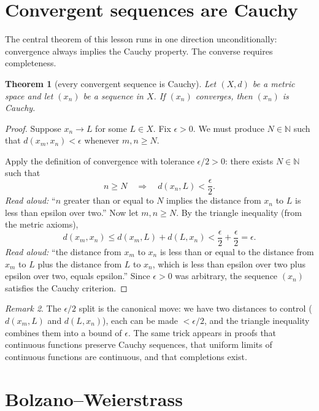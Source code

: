 \documentclass[11pt]{article}
\newtheorem{theorem}{Theorem}
\theoremstyle{definition}
\theoremstyle{remark}
\newtheorem{remark}[theorem]{Remark}
\begin{document}
\section{Convergent sequences are Cauchy}

The central theorem of this lesson runs in one direction
unconditionally: convergence always implies the Cauchy
property. The converse requires completeness.

\begin{theorem}[every convergent sequence is Cauchy]
\label{thm:conv-implies-cauchy}
Let $(X, d)$ be a metric space and let $(x_n)$ be a sequence
in $X$. If $(x_n)$ converges, then $(x_n)$ is Cauchy.
\end{theorem}

\begin{proof}
Suppose $x_n \to L$ for some $L \in X$. Fix $\epsilon > 0$.
We must produce $N \in \mathbb{N}$ such that
$d(x_m, x_n) < \epsilon$ whenever $m, n \ge N$.

Apply the definition of convergence with tolerance
$\epsilon/2 > 0$: there exists $N \in \mathbb{N}$ such that
\[
n \ge N \quad \Longrightarrow \quad d(x_n, L) < \frac{\epsilon}{2}.
\]
\emph{Read aloud:} ``$n$ greater than or equal to $N$ implies
the distance from $x_n$ to $L$ is less than epsilon over two.''
Now let $m, n \ge N$. By the triangle inequality
(from the metric axioms),
\[
d(x_m, x_n) \le d(x_m, L) + d(L, x_n)
< \frac{\epsilon}{2} + \frac{\epsilon}{2} = \epsilon.
\]
\emph{Read aloud:} ``the distance from $x_m$ to $x_n$ is less
than or equal to the distance from $x_m$ to $L$ plus the
distance from $L$ to $x_n$, which is less than epsilon over two
plus epsilon over two, equals epsilon.''
Since $\epsilon > 0$ was arbitrary, the sequence $(x_n)$
satisfies the Cauchy criterion.
\end{proof}

\begin{remark}
The $\epsilon/2$ split is the canonical move: we have two
distances to control ($d(x_m, L)$ and $d(L, x_n)$), each can
be made $< \epsilon/2$, and the triangle inequality combines
them into a bound of $\epsilon$. The same trick appears in
proofs that continuous functions preserve Cauchy sequences,
that uniform limits of continuous functions are continuous,
and that completions exist.
\end{remark}

\section{Bolzano--Weierstrass}
\end{document}
